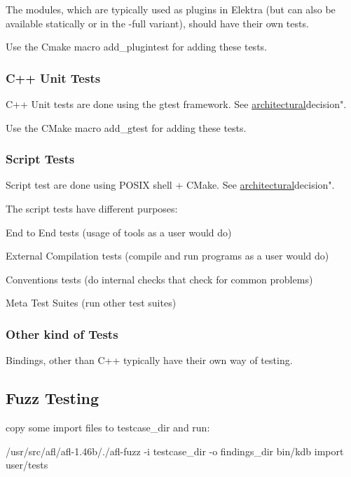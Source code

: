 The modules, which are typically used as plugins in Elektra (but can also be available statically or in the -\/full variant), should have their own tests.

Use the Cmake macro add\+\_\+plugintest for adding these tests.

\subsubsection*{C++ Unit Tests}

C++ Unit tests are done using the gtest framework. See \hyperlink{doc_decisions_unit_testing_md}{architectural}decision".

Use the C\+Make macro add\+\_\+gtest for adding these tests.

\subsubsection*{Script Tests}

Script test are done using P\+O\+S\+I\+X shell + C\+Make. See \hyperlink{doc_decisions_script_testing_md}{architectural}decision".

The script tests have different purposes\+:
\begin{DoxyItemize}
\item End to End tests (usage of tools as a user would do)
\item External Compilation tests (compile and run programs as a user would do)
\item Conventions tests (do internal checks that check for common problems)
\item Meta Test Suites (run other test suites)
\end{DoxyItemize}

\subsubsection*{Other kind of Tests}

Bindings, other than C++ typically have their own way of testing.

\subsection*{Fuzz Testing}

copy some import files to testcase\+\_\+dir and run\+:

/usr/src/afl/afl-\/1.46b/./afl-\/fuzz -\/i testcase\+\_\+dir -\/o findings\+\_\+dir bin/kdb import user/tests 